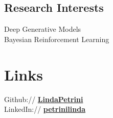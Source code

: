 \documentclass[a4paper]{deedy-resume} %
\begin{document}
\begin{minipage}[t]{0.33\textwidth} %


%
%
%
%
%
%
%
%
%

\sectionspace
\subsection{Research Interests} 

Deep Generative Models \\
Bayesian Reinforcement Learning \\
 
\section{Links} 

Github:// \href{https://github.com/LindaPetrini}{\bf LindaPetrini} \\
LinkedIn:// \href{https://www.linkedin.com/in/petrinilinda}{\bf petrinilinda} \\


\end{minipage}
\end{document}

